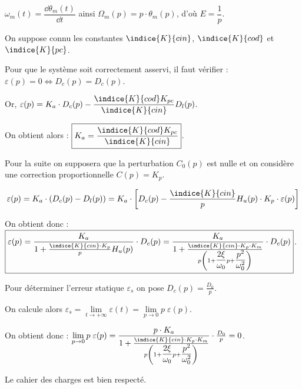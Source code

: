 \ifprof
\begin{corrige}
$\omega_m(t)=\dfrac{\dd \theta_m(t)}{\dd t}$ ainsi $\Omega_m(p)=p\cdot \theta_m(p)$, d'où $E=\dfrac{1}{p}$.
\end{corrige}
\else
\fi

On suppose connu les constantes $\indice{K}{cin}$, $\indice{K}{cod}$ et $\indice{K}{pc}$.

\ifprof
\begin{corrige}
Pour que le système soit correctement asservi, il faut vérifier : 
$\varepsilon(p)=0\Leftrightarrow D_c(p)=D_c(p)$.

Or, $\varepsilon(p)=K_a\cdot D_c(p)-\dfrac{\indice{K}{cod}K_{pc}}{\indice{K}{cin}}D_l(p)$.

On obtient alors : 
$
\boxed{
K_a=\dfrac{\indice{K}{cod}K_{pc}}{\indice{K}{cin}}
}
$.

\end{corrige}
\else
\fi

Pour la suite on supposera que la perturbation $C_0(p)$ est nulle et on considère une correction proportionnelle $C(p)=K_p$.

\ifprof
\begin{corrige}
\begin{align*}
\varepsilon(p)=K_a\cdot \left(D_c(p)-D_l(p)\right)=K_a\cdot \left[D_c(p)-\frac{\indice{K}{cin}}{p}H_u(p)\cdot K_p\cdot \varepsilon(p)\right]
\end{align*}

On obtient donc : 
$
\boxed{
\varepsilon(p)=\dfrac{K_a}{1+\frac{\indice{K}{cin}\cdot K_p}{p}H_u(p)}\cdot D_c(p)=\dfrac{K_a}{1+\frac{\indice{K}{cin}\cdot K_p\cdot K_m}{p\left(1+\dfrac{2\xi}{\omega_0}p+\dfrac{p^2}{\omega_0^2}\right)}}\cdot D_c(p)
}
$.

\end{corrige}
\else
\fi

\ifprof
\begin{corrige}
Pour déterminer l'erreur statique $\varepsilon_s$ on pose $D_c(p)=\frac{D_0}{p}$.

On calcule alors $\varepsilon_s=\lim\limits_{t\rightarrow+\infty} \varepsilon(t) = \lim\limits_{p\rightarrow0} p\;\varepsilon(p).$

On obtient donc : 
$
\lim\limits_{p\rightarrow0} p\;\varepsilon(p)=\dfrac{p\cdot K_a}{1+\frac{\indice{K}{cin}\cdot K_p\cdot K_m}{p\left(1+\dfrac{2\xi}{\omega_0}p+\dfrac{p^2}{\omega_0^2}\right)}}\cdot\frac{D_0}{p}=0
$.

Le cahier des charges est bien respecté.
\end{corrige}
\else
\fi

